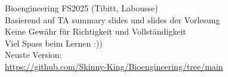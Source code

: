 Bioengineering FS2025 (Tibitt, Labousse)\\
Basierend auf TA summary slides und slides der Vorlesung\\

Keine Gewähr für Richtigkeit und Vollständigkeit\\
Viel Spass beim Lernen :))\\

Neuste Version:\\
\url{https://github.com/Skinny-King/Bioengineering/tree/main}\\
